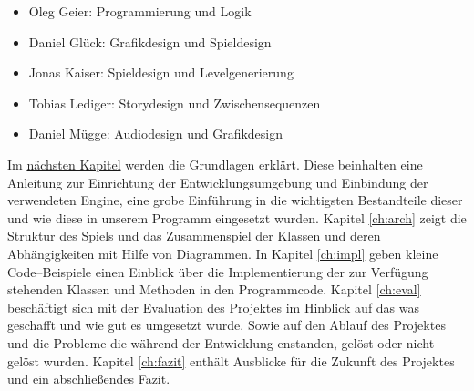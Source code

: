 \begin{itemize}

\item Oleg Geier: Programmierung und Logik

\item Daniel Glück: Grafikdesign und Spieldesign

\item Jonas Kaiser: Spieldesign und Levelgenerierung

\item Tobias Lediger: Storydesign und Zwischensequenzen

\item Daniel Mügge: Audiodesign und Grafikdesign
	
\end{itemize}



\label{sec:1_Dokumentationsstruktur}
Im \href{ch:grundl}{nächsten Kapitel} werden die Grundlagen erklärt. Diese beinhalten eine Anleitung zur Einrichtung der Entwicklungsumgebung und Einbindung der verwendeten Engine, eine grobe Einführung in die wichtigsten Bestandteile dieser und wie diese in unserem Programm eingesetzt wurden. 
Kapitel \ref{ch:arch} zeigt die Struktur des Spiels und das Zusammenspiel der Klassen und deren Abhängigkeiten mit Hilfe von Diagrammen.
In Kapitel \ref{ch:impl} geben kleine Code--Beispiele einen Einblick über die Implementierung der zur Verfügung stehenden Klassen und Methoden in den Programmcode.
Kapitel \ref{ch:eval} beschäftigt sich mit der Evaluation des Projektes im Hinblick auf das was geschafft und wie gut es umgesetzt wurde. Sowie auf den Ablauf des Projektes und die Probleme die während der Entwicklung enstanden, gelöst oder nicht gelöst wurden.
Kapitel \ref{ch:fazit} enthält Ausblicke für die Zukunft des Projektes und ein abschließendes Fazit.


